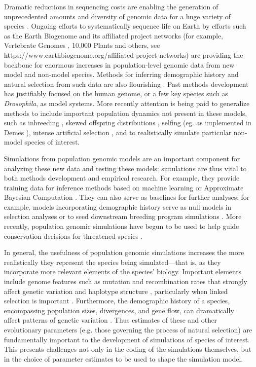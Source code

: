 \documentclass[hidelinks]{article}
\begin{document}
Dramatic reductions in sequencing costs are enabling the generation of
unprecedented amounts and diversity of genomic data for a huge variety of species
\citep{Ellegren2014}. Ongoing efforts to systematically sequence life on
Earth by efforts such as the Earth Biogenome \citep{Lewin2022} and its
affiliated project networks (for example, Vertebrate Genomes
\citep{Rhie2021}, 10,000 Plants \citep{Cheng2018} and others, see
https://www.earthbiogenome.org/affiliated-project-networks) are
providing the backbone for enormous increases in population-level genomic data from
new model and non-model species. Methods for inferring
demographic history and natural selection from such data are also flourishing
\citep{Beichman2018}. Past methods development has justifiably focused on the
human genome, or a few key species such as \emph{Drosophila}, 
as model systems. More recently attention is being paid to
generalize methods to include important population dynamics not present
in these models, such as inbreeding \citep{Blischak2020}, skewed offspring
distributions \citep{Montano2016}, selfing (eg. as implemented in Demes
\citep{Gower2022}), intense artificial selection \citep{MacLeod2013,
MacLeod2014}, and to realistically simulate particular non-model species of interest.

Simulations from population genomic models are an important component
for analyzing these new data and testing these models; 
simulations are thus vital to both methods
development and empirical research. For example, they provide training
data for inference methods based on machine learning \citep{Schrider2018} or
Approximate Bayesian Computation \citep{Csillery2010}. They can also serve as
baselines for further analyses: for example, models incorporating
demographic history serve as null models in selection analyses
\citep{Hsieh2016a} or to seed downstream breeding program simulations
\citep{Gaynor2020}. More recently, population genomic simulations have begun
to be used to help guide conservation decisions for threatened species
\citep{Teixeira2021}.

In general, the usefulness of population genomic simulations increases
the more realistically they represent the species being simulated---that
is, as they incorporate more relevant elements of the species' biology. Important
elements include genome features such as mutation and recombination
rates that strongly affect genetic variation and haplotype structure
\citep{Nachman2002}, particularly when linked selection is important \citep{Cutter2013}. 
Furthermore, the demographic history of a
species, encompassing population sizes, divergences, and gene flow, can
dramatically affect patterns of genetic variation \citep{Teshima2006}. Thus
estimates of these and other evolutionary parameters (e.g. those governing
the process of natural selection) are fundamentally important to the
development of simulations of species of interest. This presents
challenges not only in the coding of the simulations themselves, but in
the choice of parameter estimates to be used to shape the simulation
model.
\end{document}
